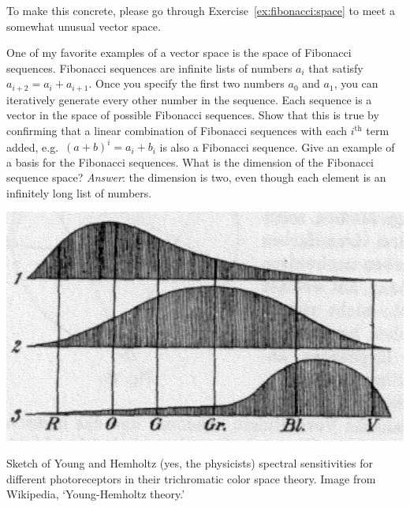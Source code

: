 To make this concrete, please go through Exercise~\ref{ex:fibonacci:space} to meet a somewhat unusual vector space.
\begin{exercise}\label{ex:fibonacci:space}
One of my favorite examples of a vector space is the space of Fibonacci sequences. Fibonacci sequences are infinite lists of numbers $a_i$ that satisfy $a_{i+2} = a_i+a_{i+1}$. Once you specify the first two numbers $a_0$ and $a_1$, you can iteratively generate every other number in the sequence. Each sequence is a vector in the space of possible Fibonacci sequences. Show that this is true by confirming that a linear combination of Fibonacci sequences with each $i^\text{th}$ term added, e.g.\ $(a+b)^i = a_i+b_i$ is also a Fibonacci sequence. Give an example of a basis for the Fibonacci sequences. What is the dimension of the Fibonacci sequence space? \emph{Answer}: the dimension is two, even though each element is an infinitely long list of numbers.
\end{exercise}
\begin{marginfigure}%
    \includegraphics[width=\textwidth]{figures/YoungHelm.jpg}
    \caption{Sketch of Young and Hemholtz (yes, the physicists) spectral sensitivities for different photoreceptors in their trichromatic color space theory. Image from Wikipedia, `Young-Hemholtz theory.'}
    \label{fig:young:hemholtz}
\end{marginfigure}
